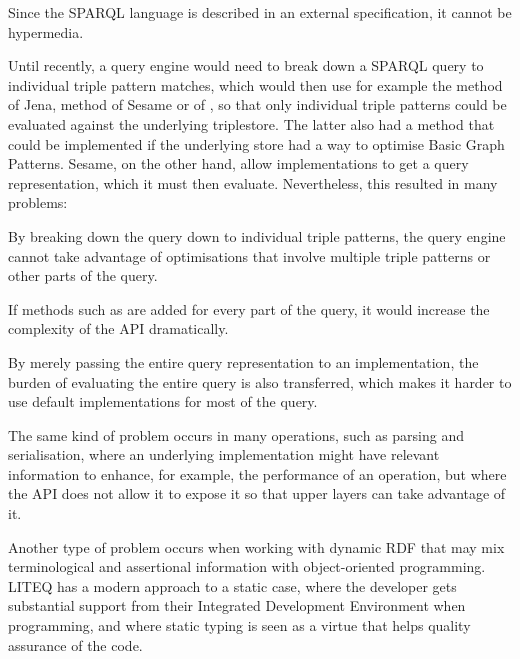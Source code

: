 \begin{problem}\label{prob:tpf}
Since the SPARQL language is described in an external specification,
it cannot be hypermedia.
\end{problem}

Until recently, a query engine would need to break down a SPARQL query
to individual triple pattern matches, which would then use for example
the  method of Jena,  method
of Sesame or  of , so that only
individual triple patterns could be evaluated against the underlying
triplestore.  The latter also had a  method that
could be implemented if the underlying store had a way to optimise
Basic Graph Patterns. Sesame, on the other hand, allow implementations
to get a query representation, which it must then evaluate.
Nevertheless, this resulted in many problems:

\begin{problem}\label{prob:breakdown}
By breaking down the query down to individual triple patterns, the
query engine cannot take advantage of optimisations that involve
multiple triple patterns or other parts of the query.
\end{problem}

\begin{problem}\label{prob:complexapi}
If methods such as  are added for every part of the
query, it would increase the complexity of the API dramatically.
\end{problem}

\begin{problem}\label{prob:dontjustpass}
By merely passing the entire query representation to an
implementation, the burden of evaluating the entire query is also
transferred, which makes it harder to use default implementations for
most of the query.
\end{problem}

The same kind of problem occurs in many operations, such as parsing
and serialisation, where an underlying implementation might have
relevant information to enhance, for example, the performance of an operation,
but where the API does not allow it to expose it so that upper layers
can take advantage of it.

Another type of problem occurs when working with dynamic RDF that may
mix terminological and assertional information with object-oriented
programming. LITEQ \cite{leinberger2014semantic} has a modern approach
to a static case, where the developer gets substantial support from
their Integrated Development Environment when programming, and where
static typing is seen as a virtue that helps quality assurance of the
code.

